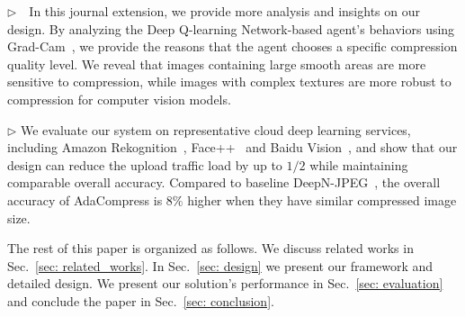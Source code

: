 $\rhd$~~In this journal extension, we provide more analysis and insights on our design. By analyzing the Deep Q-learning Network-based agent's behaviors using Grad-Cam~\cite{grad-cam}, we provide the reasons that the agent chooses a specific compression quality level. We reveal that images containing large smooth areas are more sensitive to compression, while images with complex textures are more robust to compression for computer vision models.
	
$\rhd$ We evaluate our system on representative cloud deep learning services, including Amazon Rekognition~\cite{amazon_rekognition}, Face++~\cite{face++_service} and Baidu Vision~\cite{baidu_vision}, and show that our design can reduce the upload traffic load by up to $1/2$ while maintaining comparable overall accuracy. Compared to baseline DeepN-JPEG~\cite{DeepN-JPEG}, the overall accuracy of AdaCompress is $8\%$ higher when they have similar compressed image size.

The rest of this paper is organized as follows. We discuss related works in Sec.~\ref{sec: related_works}. In Sec.~\ref{sec: design} we present our framework and detailed design. We present our solution's performance in Sec.~\ref{sec: evaluation} and conclude the paper in Sec.~\ref{sec: conclusion}.

